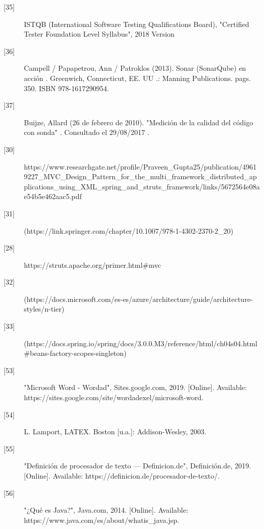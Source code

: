 \begin{description}
		\item[\hypertarget{b35}{[35]}] ISTQB (International Software Testing Qualifications Board), "Certified Tester
		Foundation Level Syllabus", 2018 Version 
		
		\item[\hypertarget{b36}{[36]}] Campell / Papapetrou, Ann / Patroklos (2013). Sonar (SonarQube) en acción . Greenwich, Connecticut, EE. UU .: Manning Publications. pags. 350. ISBN 978-1617290954.
		
		\item[\hypertarget{b37}{[37]}] Buijze, Allard (26 de febrero de 2010). "Medición de la calidad del código con sonda" . Consultado el 29/08/2017 .
				
		\item[\hypertarget{b30}{[30]}] 	https://www.researchgate.net/profile/Praveen\_Gupta25/publication/49619227\_MVC\_Design\_Pattern\_for\_the\_multi\_framework\_distributed\_applications\_using\_XML\_spring\_and\_struts\_framework/links/5672564e08ae54b5e462aac5.pdf
		
		\item[\hypertarget{b31}{[31]}] (https://link.springer.com/chapter/10.1007/978-1-4302-2370-2\_20)
		
		\item[\hypertarget{b28}{[28]}] https://struts.apache.org/primer.html\#mvc
		
		\item[\hypertarget{b32}{[32]}] (https://docs.microsoft.com/es-es/azure/architecture/guide/architecture-styles/n-tier)
		\item[\hypertarget{b33}{[33]}](https://docs.spring.io/spring/docs/3.0.0.M3/reference/html/ch04s04.html\#beans-factory-scopes-singleton)
		
		\item[\hypertarget{b53}{[53]}]"Microsoft Word - Wordad", Sites.google.com, 2019. [Online]. Available: https://sites.google.com/site/wordadexel/microsoft-word. 
		
		\item[\hypertarget{b54}{[54]}]L. Lamport, LATEX. Boston [u.a.]: Addison-Wesley, 2003.
		
		\item[\hypertarget{b55}{[55]}] "Definición de procesador de texto — Definicion.de", Definición.de, 2019. [Online]. Available: https://definicion.de/procesador-de-texto/. 
		
		\item[\hypertarget{b56}{[56]}] "¿Qué es Java?", Java.com, 2014. [Online]. Available: https://www.java.com/es/about/whatis\_java.jsp. 
		

\end{description}
